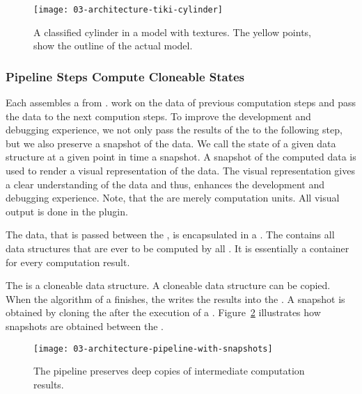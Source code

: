 \documentclass[../../ClassicThesis.tex]{subfiles}
\begin{document}
\begin{figure}[h]
  \centering
  \texttt{[image: 03-architecture-tiki-cylinder]}
  \caption{A classified cylinder in a model with textures.
    The yellow points, show the outline of the actual model.}
  \label{fig:tiki-cylinder}
\end{figure}

\paragraph{}


\subsubsection{Pipeline Steps Compute Cloneable States}

Each \class{\fabmethod} assembles a  from
.  work on the
data of previous computation steps and pass the data to the
next compution steps. To improve the development and
debugging experience, we not only pass the results of the
 to the following step, but we also
preserve a snapshot of the data. We call the state of a
given data structure at a given point in time a snapshot. A
snapshot of the computed data is used to render a visual
representation of the data. The visual representation gives
a clear understanding of the data and thus, enhances the
development and debugging experience.  Note, that the
 are merely computation units. All
visual output is done in the  plugin.

The data, that is passed between the , is
encapsulated in a . The
 contains all data structures that are
ever to be computed by all . It is
essentially a container for every computation result.

The  is a cloneable data structure. A cloneable
data structure can be copied. When the algorithm of a
 finishes, the  writes the results
into the . A snapshot is obtained by cloning the
 after the execution of a .
Figure~\ref{fig:pipeline-with-snapshots} illustrates how snapshots are
obtained between the .

\begin{figure}[h]
  \centering
  \texttt{[image: 03-architecture-pipeline-with-snapshots]}
  \caption{The pipeline preserves deep copies of intermediate computation results.}
  \label{fig:pipeline-with-snapshots}
\end{figure}
\end{document}
